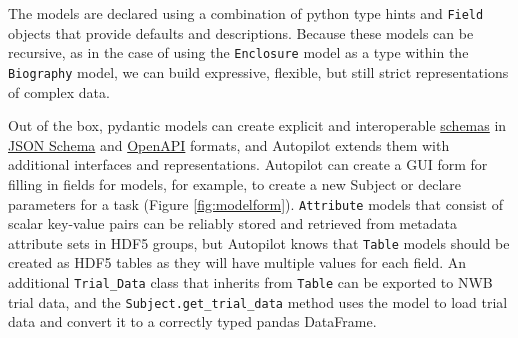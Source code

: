 The models are declared using a combination of python type hints and \texttt{Field} objects that provide defaults and descriptions. Because these models can be recursive, as in the case of using the \texttt{Enclosure} model as a type within the \texttt{Biography} model, we can build expressive, flexible, but still strict representations of complex data. 

Out of the box, pydantic models can create explicit and interoperable \href{https://pydantic-docs.helpmanual.io/usage/schema/}{schemas} in \href{https://json-schema.org/draft/2020-12/json-schema-core.html}{JSON Schema} and \href{https://github.com/OAI/OpenAPI-Specification}{OpenAPI} formats, and Autopilot extends them with additional interfaces and representations. Autopilot can create a GUI form for filling in fields for models, for example, to create a new Subject or declare parameters for a task (Figure \ref{fig:modelform}). \texttt{Attribute} models that consist of scalar key-value pairs can be reliably stored and retrieved from metadata attribute sets in HDF5 groups, but Autopilot knows that \texttt{Table} models should be created as HDF5 tables as they will have multiple values for each field. An additional \texttt{Trial\_Data} class that inherits from \texttt{Table} can be exported to NWB trial data, and the \texttt{Subject.get\_trial\_data} method uses the model to load trial data and convert it to a correctly typed pandas\citep{mckinneyPandasFoundationalPython2011} DataFrame.

